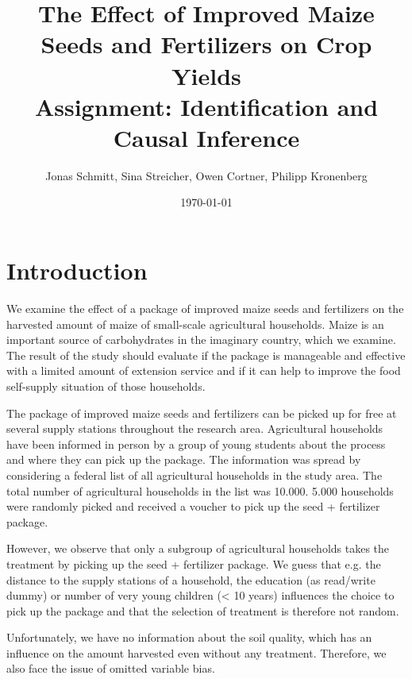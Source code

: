 



\title{\huge The Effect of Improved Maize Seeds and Fertilizers on Crop Yields \\
\LARGE Assignment: Identification and Causal Inference}

\author{Jonas Schmitt, Sina Streicher, Owen Cortner, Philipp Kronenberg}

\date{\small \today}

\clearpage\maketitle
\thispagestyle{empty}

\renewcommand{\labelenumi}{\alph{enumi})}

\section{Introduction} \label{sec:introduction}

We examine the effect of a package of improved maize seeds and fertilizers on the harvested amount of maize of small-scale agricultural households. Maize is an important source of carbohydrates in the imaginary country, which we examine. The result of the study should evaluate if the package is manageable and effective with a limited amount of extension service and if it can help to improve the food self-supply situation of those households. 

The package of improved maize seeds and fertilizers can be picked up for free at several supply stations throughout the research area. Agricultural households have been informed in person by a group of young students about the process and where they can pick up the package. The information was spread by considering a federal list of all agricultural households in the study area. The total number of agricultural households in the list was 10.000. 5.000 households were randomly picked and received a voucher to pick up the seed + fertilizer package. 

However, we observe that only a subgroup of agricultural households takes the treatment by picking up the seed + fertilizer package. We guess that e.g. the distance to the supply stations of a household, the education (as read/write dummy) or number of very young children (< 10 years) influences the choice to pick up the package and that the selection of treatment is therefore not random. 

Unfortunately, we have no information about the soil quality, which has an influence on the amount harvested even without any treatment. Therefore, we also face the issue of omitted variable bias. 

